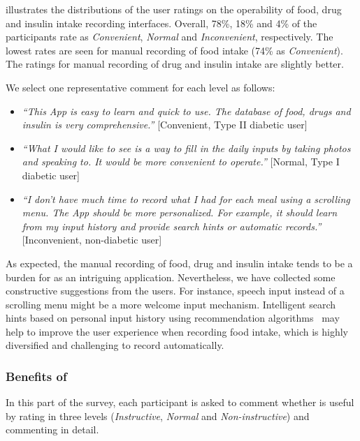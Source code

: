 { illustrates the distributions of the user ratings on the operability of food, drug and insulin intake recording interfaces.
Overall, 78\%, 18\% and 4\% of the participants rate \sysname as \textit{Convenient}, \textit{Normal} and \textit{Inconvenient}, respectively.
The lowest rates are seen for manual recording of food intake (74\% as \textit{Convenient}).
The ratings for manual recording of drug and insulin intake are slightly better.

We select one representative comment for each level as follows:
\begin{itemize}
  \item
  \textit{``This App is easy to learn and quick to use.
  The database of food, drugs and insulin is very comprehensive.''}
  [Convenient, Type II diabetic user]
  \item
  \textit{``What I would like to see is a way to fill in the daily inputs by taking photos and speaking to.
  It would be more convenient to operate.''}
  [Normal, Type I diabetic user]
  \item
  \textit{``I don't have much time to record what I had for each meal using a scrolling menu.
  The App should be more personalized.
  For example, it should learn from my input history and provide search hints or automatic records.''}
  [Inconvenient, non-diabetic user]
\end{itemize}

As expected, the manual recording of food, drug and insulin intake tends to be a burden for \sysname as an intriguing application.
Nevertheless, we have collected some constructive suggestions from the users.
For instance, speech input instead of a scrolling menu might be a more welcome input mechanism.
Intelligent search hints based on personal input history using recommendation algorithms~\cite{bib:fu2000mining} may help to improve the user experience when recording food intake, which is highly diversified and challenging to record automatically.

\subsubsection{Benefits of \sysname}
In this part of the survey, each participant is asked to comment whether \sysname is useful by rating \sysname in three levels (\textit{Instructive}, \textit{Normal} and \textit{Non-instructive}) and commenting in detail.

}
